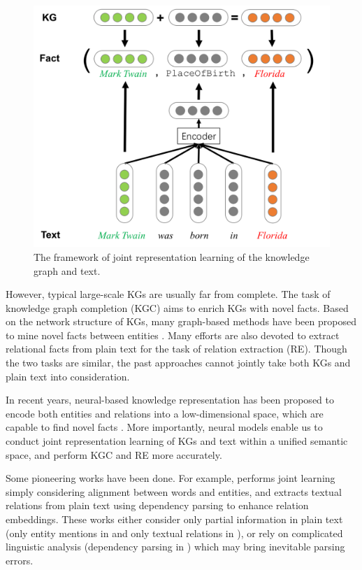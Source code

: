\documentclass[11pt,a4paper]{article}
\begin{document}
\begin{figure}[]
\centering
\includegraphics[width=\columnwidth]{gg1.png}
\caption{The framework of joint representation learning of the knowledge graph and text.}
\label{fig:joinglearning}
\end{figure}

However, typical large-scale KGs are usually far from complete. The task of knowledge graph completion (KGC) aims to enrich KGs with novel facts. Based on the network structure of KGs, many graph-based methods have been proposed to mine novel facts between entities \cite{lao2011random,lao2010relational}. Many efforts are also devoted to extract relational facts from plain text \cite{surdeanu2012multi,riedel2013relation,min2013distant,zeng2014relation,zeng2015distant,dos2015classifying,lin2016neural} for the task of relation extraction (RE). Though the two tasks are similar, the past approaches cannot jointly take both KGs and plain text into consideration.

In recent years, neural-based knowledge representation has been proposed to encode both entities and relations into a low-dimensional space, which are capable to find novel facts \cite{bordes2013translating,wang2014transh,lin2015learning,ji2015knowledge,he2015learning,xiao2015transg,ji2016knowledge}. More importantly, neural models enable us to conduct joint representation learning of KGs and text within a unified semantic space, and perform KGC and RE more accurately.

Some pioneering works have been done. For example, \cite{wang2014knowledge} performs joint learning simply considering alignment between words and entities, and \cite{toutanova2015representing} extracts textual relations from plain text using dependency parsing to enhance relation embeddings. These works either consider only partial information in plain text (only entity mentions in \cite{wang2014knowledge,xie2016representation,wu2016knowledge,zeng2016incorporating} and only textual relations in \cite{toutanova2015representing}), or rely on complicated linguistic analysis (dependency parsing in \cite{toutanova2015representing}) which may bring inevitable parsing errors.
\end{document}
